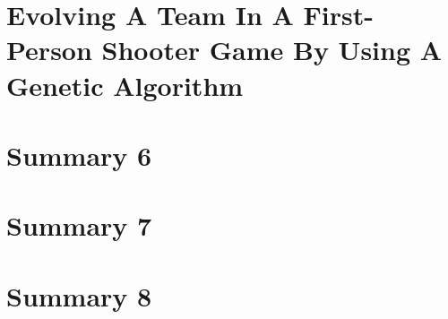 \documentclass[12pt]{article} %
\begin{document}
\newpage
\section{Evolving A Team In A First-Person Shooter Game By Using A Genetic Algorithm} %

\section{Summary 6} %

\section{Summary 7} %

\section{Summary 8} %



\newpage

\nocite{*}


 

\end{document}
